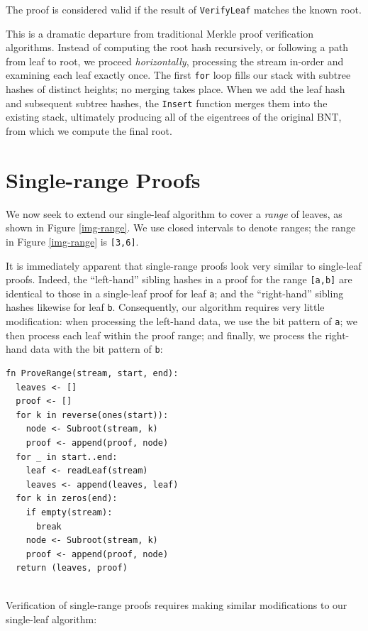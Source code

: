 \documentclass[twocolumn]{article}
\begin{document}
The proof is considered valid if the result of \verb`VerifyLeaf` matches the known root.

This is a dramatic departure from traditional Merkle proof verification algorithms. Instead of computing the root hash recursively, or following a path from leaf to root, we proceed \textit{horizontally}, processing the stream in-order and examining each leaf exactly once. The first \verb`for` loop fills our stack with subtree hashes of distinct heights; no merging takes place. When we add the leaf hash and subsequent subtree hashes, the \verb`Insert` function merges them into the existing stack, ultimately producing all of the eigentrees of the original BNT, from which we compute the final root.


\section{Single-range Proofs}

We now seek to extend our single-leaf algorithm to cover a \textit{range} of leaves, as shown in Figure \ref{img-range}. We use closed intervals to denote ranges; the range in Figure \ref{img-range} is \verb`[3,6]`.

It is immediately apparent that single-range proofs look very similar to single-leaf proofs. Indeed, the ``left-hand'' sibling hashes in a proof for the range \verb`[a,b]` are identical to those in a single-leaf proof for leaf \verb`a`; and the ``right-hand'' sibling hashes likewise for leaf \verb`b`. Consequently, our algorithm requires very little modification: when processing the left-hand data, we use the bit pattern of \verb`a`; we then process each leaf within the proof range; and finally, we process the right-hand data with the bit pattern of \verb`b`:

\begin{minipage}[c]{0.95\textwidth}
\begin{lstlisting}
fn ProveRange(stream, start, end):
  leaves <- []
  proof <- []
  for k in reverse(ones(start)):
    node <- Subroot(stream, k)
    proof <- append(proof, node)
  for _ in start..end:
    leaf <- readLeaf(stream)
    leaves <- append(leaves, leaf)
  for k in zeros(end):
    if empty(stream):
      break
    node <- Subroot(stream, k)
    proof <- append(proof, node)
  return (leaves, proof)
  
\end{lstlisting}
\end{minipage}

\noindent Verification of single-range proofs requires making similar modifications to our single-leaf algorithm:
\end{document}
